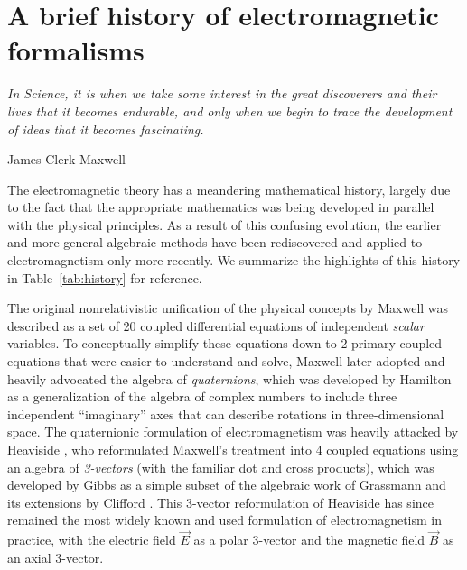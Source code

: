 \documentclass[1p,sort&compress]{elsarticle}
\numberwithin{equation}{section}
\newcommand{\rv}[1]{\vec{#1}}
\newcommand\epigraph[3]{
\vspace{1em}\hfill{}\begin{minipage}{#1}{\begin{spacing}{0.9}
\small\noindent\textit{#2}\end{spacing}
\vspace{1em}
\hfill{}{#3}}\vspace{2em}
\end{minipage}}
\begin{document}

\section{A brief history of electromagnetic formalisms}\label{sec:history}

\epigraph{4.5in}{In Science, it is when we take some interest in the great discoverers and their lives that it becomes endurable, and only when we begin to trace the development of ideas that it becomes fascinating.}{James Clerk Maxwell \cite{Scully2007}}


The electromagnetic theory has a meandering mathematical history, largely due to the fact that the appropriate mathematics was being developed in parallel with the physical principles.  As a result of this confusing evolution, the earlier and more general algebraic methods have been rediscovered and applied to electromagnetism only more recently. We summarize the highlights of this history in Table~\ref{tab:history} for reference.

The original nonrelativistic unification of the physical concepts by Maxwell \cite{Maxwell1861,Maxwell1861b,Maxwell1862,Maxwell1862b,Maxwell1865} was described as a set of 20 coupled differential equations of independent \emph{scalar} variables.  To conceptually simplify these equations down to 2 primary coupled equations that were easier to understand and solve, Maxwell later adopted and heavily advocated \cite{Maxwell1881} the algebra of \emph{quaternions}, which was developed by Hamilton \cite{Hamilton1853,Hamilton1901} as a generalization of the algebra of complex numbers to include three independent ``imaginary'' axes that can describe rotations in three-dimensional space.  The quaternionic formulation of electromagnetism was heavily attacked by Heaviside \cite{Heaviside1892,Heaviside1893}, who reformulated Maxwell's treatment into 4 coupled equations using an algebra of \emph{3-vectors} (with the familiar dot and cross products), which was developed by Gibbs \cite{Wilson1901} as a simple subset of the algebraic work of Grassmann \cite{Grassmann1844} and its extensions by Clifford \cite{Clifford1878}.  This 3-vector reformulation of Heaviside has since remained the most widely known and used formulation of electromagnetism in practice, with the electric field $\rv{E}$ as a polar 3-vector and the magnetic field $\rv{B}$ as an axial 3-vector.
\end{document}
